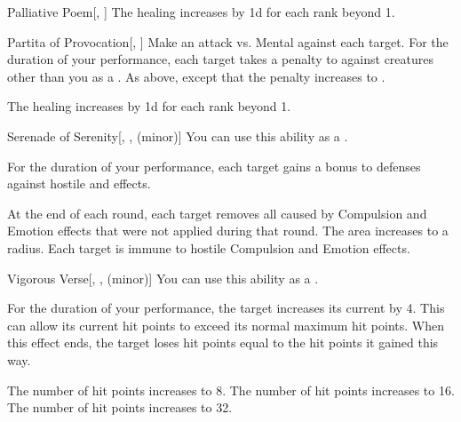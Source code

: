 {\begin{freeability}{Palliative Poem}[, ]
                \rankline
                The healing increases by \plus1d for each rank beyond 1.
            \end{freeability}

            \begin{freeability}{Partita of Provocation}[, ]
                Make an attack vs. Mental against each target.
                \hit For the duration of your performance, each target takes a  penalty to  against creatures other than you as a .
                \crit As above, except that the penalty increases to .

                \rankline
                The healing increases by \plus1d for each rank beyond 1.
            \end{freeability}

            \begin{freeability}{Serenade of Serenity}[, ,  (minor)]
                You can use this ability as a .

                For the duration of your performance, each target gains a  bonus to defenses against hostile  and  effects.

                \rankline
                 At the end of each round, each target removes all  caused by Compulsion and Emotion effects that were not applied during that round.
                 The area increases to a \areahuge radius.
                 Each target is immune to hostile Compulsion and Emotion effects.
            \end{freeability}

            \begin{freeability}{Vigorous Verse}[, ,  (minor)]
                You can use this ability as a .

                For the duration of your performance, the target increases its current  by 4.
                This can allow its current hit points to exceed its normal maximum hit points.
                When this effect ends, the target loses hit points equal to the hit points it gained this way.

                \rankline
                 The number of hit points increases to 8.
                 The number of hit points increases to 16.
                 The number of hit points increases to 32.
            \end{freeability}
        }


